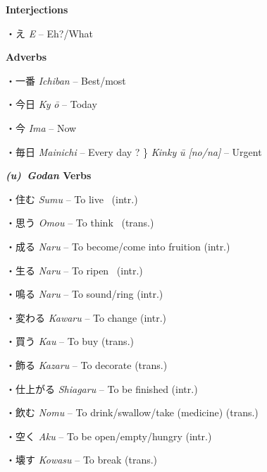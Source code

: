 \par{\textbf{Interjections }}

\par{・え  \emph{E } – Eh?\slash What }

\par{\textbf{Adverbs }}

\par{・一番 \emph{Ichiban }– Best\slash most }

\par{・今日 \emph{Ky }\emph{ō }– Today }

\par{・今 \emph{Ima }– Now }

\par{・毎日  \emph{Mainichi }– Every day ? \} \emph{Kinky }\emph{ū [no\slash na] }– Urgent }

\par{\textbf{\emph{(u) Godan }Verbs }}

\par{・住む \emph{Sumu }– To live  (intr.) }

\par{・思う \emph{Omou }– To think  (trans.) }

\par{・成る \emph{Naru }– To become\slash come into fruition (intr.) }

\par{・生る \emph{Naru }– To ripen  (intr.) }

\par{・鳴る \emph{Naru }– To sound\slash ring (intr.) }

\par{・変わる \emph{Kawaru }– To change (intr.) }

\par{・買う \emph{Kau }– To buy (trans.) }

\par{・飾る \emph{Kazaru }– To decorate (trans.) }

\par{・仕上がる \emph{Shiagaru }– To be finished (intr.) }

\par{・飲む \emph{Nomu }– To drink\slash swallow\slash take (medicine) (trans.) }

\par{・空く \emph{Aku }– To be open\slash empty\slash hungry (intr.) }

\par{・壊す \emph{Kowasu }– To break (trans.) }

